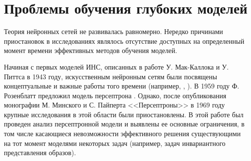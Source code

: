 

\section{Проблемы обучения глубоких моделей}

Теория нейронных сетей не развивалась равномерно. Нередко причинами приостановок в исследованиях являлось отсутствие доступных на определенный момент времени эффективных методов обучения моделей. 

Начиная с первых моделей ИНС, описанных в работе У. Мак-Каллока и У. Питтса \cite{mcculloch43a} в 1943 году, искусственным нейронным сетям были посвящены концептуальные и важные работы того времени (например, \cite{hebb1949}, \cite{widrow1960}). В 1959 году Ф. Розенблатт предложил модель персептрона \cite{rosenblatt1959}. Однако, после опубликования монографии М. Минского и С. Пайперта <<Персептроны>> в 1969 году \cite{minsky69perceptrons} крупные исследования в этой области были приостановлены. В этой работе был проведен анализ персептронной модели и выявлены ее основные ограничения, в том числе касающиеся невозможности эффективного решения существующими на тот момент моделями некоторых задач (например, задач инвариантного представления образов). %

